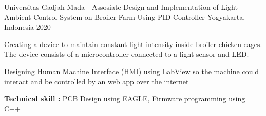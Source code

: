 \begin{cventries}
\cventry
{Universitas Gadjah Mada - Assosiate} %
{Design and Implementation of Light Ambient Control System on Broiler Farm Using PID Controller} %
{Yogyakarta, Indonesia} %
{2020} %
{
  \begin{cvitems} %
    \item{Creating a device to maintain constant light intensity inside broiler chicken cages. The device consists of a microcontroller connected to a light sensor and LED.}
    \item{Designing Human Machine Interface (HMI) using LabView so the machine could interact and be controlled by an web app over the internet}
    \item{\textbf{Technical skill : } PCB Design using EAGLE, Firmware programming using C++}
  \end{cvitems}
}



\end{cventries}
